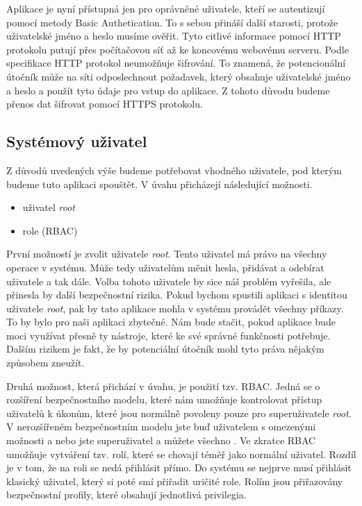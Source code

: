 Aplikace je nyní přístupná jen pro oprávněné uživatele, kteří se autentizují pomocí metody Basic Authetication. To s sebou přináší další starosti, protože uživatelské jméno a heslo musíme ověřit. Tyto citlivé informace pomocí HTTP protokolu putují přes počítačovou síť až ke koncovému webovému serveru. Podle specifikace \cite{RFC2616} HTTP protokol neumožňuje šifrování. To znamená, že potencionální útočník může na síti odposlechnout požadavek, který obsahuje uživatelské jméno a heslo a použít tyto údaje pro vstup do aplikace. Z tohoto důvodu budeme přenos dat šifrovat pomocí HTTPS protokolu.
    \subsection{Systémový uživatel}
    \label{sysuser}
    Z důvodů uvedených výše budeme potřebovat vhodného uživatele, pod kterým budeme tuto aplikaci spouštět. V úvahu přicházejí následující možnosti.
    \begin{itemize}
      \item uživatel \emph{root}
      \item role (RBAC)
    \end{itemize}

    První možností je zvolit uživatele \emph{root}. Tento uživatel má právo na všechny operace v systému. Může tedy uživatelům měnit hesla, přidávat a odebírat uživatele a tak dále. Volba tohoto uživatele by sice náš problém vyřešila, ale přinesla by další bezpečnostní rizika. Pokud bychom spustili aplikaci s identitou uživatele \emph{root}, pak by tato aplikace mohla v systému provádět všechny příkazy. To by bylo pro naši aplikaci zbytečné. Nám bude stačit, pokud aplikace bude moci využívat přesně ty nástroje, které ke své správné funkčnosti potřebuje. Dalším rizikem je fakt, že by potenciální útočník mohl tyto práva nějakým způsobem zneužít.

    Druhá možnost, která přichází v úvahu, je použití tzv. RBAC. Jedná se o rozšíření bezpečnostního modelu, které nám umožňuje kontrolovat přístup uživatelů k úkonům, které jsou normálně povoleny pouze pro superuživatele \emph{root}. V nerozšířeném bezpečnostním modelu jste buď uživatelem s omezenými možnosti a nebo jste superuživatel a můžete všechno \cite{RBAC}. Ve zkratce RBAC umožňuje vytváření tzv. rolí, které se chovají téměř jako normální uživatel. Rozdíl je v tom, že na roli se nedá přihlásit přímo. Do systému se nejprve musí přihlásit klasický uživatel, který si poté smí přiřadit uričité role. Rolím jsou přiřazovány bezpečnostní profily, které obsahují jednotlivá privilegia.

